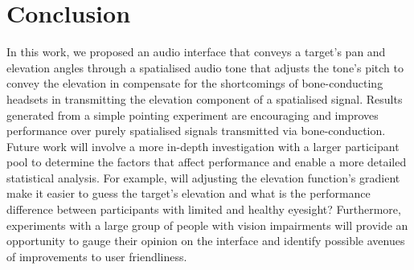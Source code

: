 \documentclass{llncs}
\begin{document}
\section{Conclusion}\label{sec:conclusion}

In this work, we proposed an audio interface that conveys a target's pan and elevation angles through a spatialised audio tone that adjusts the tone's pitch to convey the elevation in compensate for the shortcomings of bone-conducting headsets in transmitting the elevation component of a spatialised signal.
Results generated from a simple pointing experiment are encouraging and improves performance over purely spatialised signals transmitted via bone-conduction.
Future work will involve a more in-depth investigation with a larger participant pool to determine the factors that affect performance and enable a more detailed statistical analysis.
For example, will adjusting the elevation function's gradient make it easier to guess the target's elevation and what is the performance difference between participants with limited and healthy eyesight?  
Furthermore, experiments with a large group of people with vision impairments will provide an opportunity to gauge their opinion on the interface and identify possible avenues of improvements to user friendliness.



\end{document}
